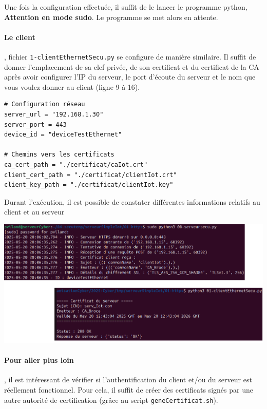 \documentclass[french, 12pt]{article}%
\begin{document}
Une fois la configuration effectuée, il suffit de le lancer le programme python, \textbf{Attention en mode sudo}. Le programme se met alors en attente. 


\paragraph{Le client}, fichier \verb?1-clientEthernetSecu.py? se configure de manière similaire. Il suffit de donner l'emplacement de sa clef privée, de son certificat et du certificat de la CA après avoir configurer l'IP du serveur, le port d'écoute du serveur et le nom que vous voulez donner au client (ligne 9 à 16).	
\begin{lstlisting}[style=commande]
# Configuration réseau
server_url = "192.168.1.30" 
server_port = 443
device_id = "deviceTestEthernet"
 
# Chemins vers les certificats
ca_cert_path = "./certificat/caIot.crt"
client_cert_path = "./certificat/clientIot.crt"
client_key_path = "./certificat/clientIot.key"

\end{lstlisting}

Durant l'exécution, il est possible de constater différentes informations relatifs au client et au serveur

\begin{center}
\includegraphics[scale=0.7]{./ressource/httpsServeurClient}
\end{center}

\paragraph{Pour aller plus loin}, il est intéressant de vérifier si l'authentification du client et/ou du serveur est réellement fonctionnel. Pour cela, il suffit de créer des certificats signés par une autre autorité de certification (grâce au script \verb?geneCertificat.sh?). 
\end{document}
